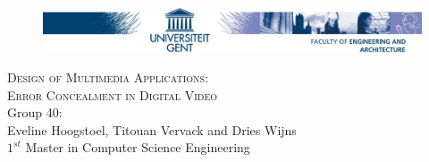 

\begin{titlepage}
\clearpage
{}

\begin{figure}[!ht]
  \begin{adjustwidth}{-1.5cm}{}
    \centering
    \includegraphics[width=\paperwidth]{logo.jpg}
  \end{adjustwidth}
\end{figure}

\begin{center}

\fontsize{12pt}{14pt}
\selectfont
 
\vspace{6cm} 
\Huge \textsc{Design of Multimedia Applications:}\\ 
\vspace{1cm}
\huge
\textsc{Error Concealment in Digital Video}\\
\vspace{11cm}
\Large
Group 40:\\
Eveline Hoogstoel, Titouan Vervack and Dries Wijns\\
$1^{st}$ Master in Computer Science Engineering


\end{center}
\end{titlepage}

\thispagestyle{empty}